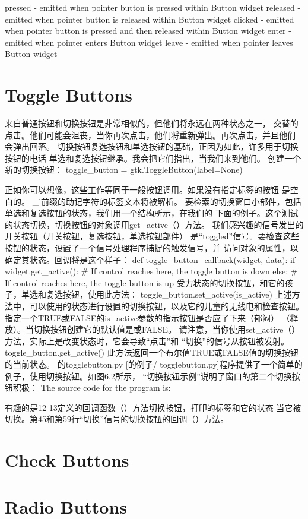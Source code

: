 pressed - emitted when pointer button is pressed within Button widget
released - emitted when pointer button is released within Button widget
clicked - emitted when pointer button is pressed and then released within Button widget
enter - emitted when pointer enters Button widget
leave - emitted when pointer leaves Button widget
\section{Toggle Buttons}
来自普通按钮和切换按钮是非常相似的，但他们将永远在两种状态之一，
交替的点击。他们可能会沮丧，当你再次点击，他们将重新弹出。再次点击，并且他们
会弹出回落。
切换按钮复选按钮和单选按钮的基础，正因为如此，许多用于切换按钮的电话
单选和复选按钮继承。我会把它们指出，当我们来到他们。
创建一个新的切换按钮：
toggle_button = gtk.ToggleButton(label=None)

正如你可以想像，这些工作等同于一般按钮调用。如果没有指定标签的按钮
是空白的。 _'前缀的助记字符的标签文本将被解析。
要检索的切换窗口小部件，包括单选和复选按钮的状态，我们用一个结构所示，在我们的
下面的例子。这个测试的状态切换，切换按钮的对象调用get_active（）方法。
我们感兴趣的信号发出的开关按钮（开关按钮，复选按钮，单选按钮部件）
是“toggled”信号。要检查这些按钮的状态，设置了一个信号处理程序捕捉的触发信号，并
访问对象的属性，以确定其状态。回调将是这个样子：
def toggle_button_callback(widget, data):
if widget.get_active():
# If control reaches here, the toggle button is down
else:
# If control reaches here, the toggle button is up
受力状态的切换按钮，和它的孩子，单选和复选按钮，使用此方法：
toggle_button.set_active(is_active)
上述方法中，可以使用的状态进行设置的切换按钮，以及它的儿童的无线电和检查按钮。
指定一个TRUE或FALSE的is_active参数的指示按钮是否应了下来（郁闷）
（释放）。当切换按钮创建它的默认值是或FALSE。
请注意，当你使用set_active（）方法，实际上是改变状态时，它会导致“点击”和
“切换”的信号从按钮被发射。
toggle_button.get_active()
此方法返回一个布尔值TRUE或FALSE值的切换按钮的当前状态。
的togglebutton.py [的例子/ togglebutton.py]程序提供了一个简单的例子，使用切换按钮。如图6.2所示，
“切换按钮示例”说明了窗口的第二个切换按钮积极：
The source code for the program is:


有趣的是12-13定义的回调函数（）方法切换按钮，打印的标签和它的状态
当它被切换。第45和第59行“切换”信号的切换按钮的回调（）方法。
\section{Check Buttons}
\section{Radio Buttons}

